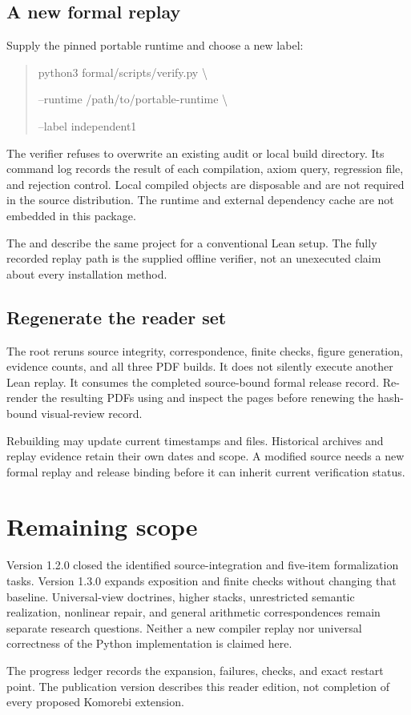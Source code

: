 \documentclass[11pt]{article}
\begin{document}
\subsection{A new formal replay}
Supply the pinned portable runtime and choose a new label:
\begin{quote}\small\ttfamily
python3 formal/scripts/verify.py \textbackslash\par
\hspace*{1em}--runtime /path/to/portable-runtime \textbackslash\par
\hspace*{1em}--label independent1
\end{quote}
The verifier refuses to overwrite an existing audit or local build directory. Its command log records the result of each compilation, axiom query, regression file, and rejection control. Local compiled objects are disposable and are not required in the source distribution. The runtime and external dependency cache are not embedded in this package.

The  and  describe the same project for a conventional Lean setup. The fully recorded replay path is the supplied offline verifier, not an unexecuted claim about every installation method.

\subsection{Regenerate the reader set}
The root  reruns source integrity, correspondence, finite checks, figure generation, evidence counts, and all three PDF builds. It does not silently execute another Lean replay. It consumes the completed source-bound formal release record. Re-render the resulting PDFs using  and inspect the pages before renewing the hash-bound visual-review record.

Rebuilding may update current timestamps and files. Historical archives and replay evidence retain their own dates and scope. A modified source needs a new formal replay and release binding before it can inherit current verification status.

\section{Remaining scope}
Version 1.2.0 closed the identified source-integration and five-item formalization tasks. Version 1.3.0 expands exposition and finite checks without changing that baseline. Universal-view doctrines, higher stacks, unrestricted semantic realization, nonlinear repair, and general arithmetic correspondences remain separate research questions. Neither a new compiler replay nor universal correctness of the Python implementation is claimed here.

The progress ledger records the expansion, failures, checks, and exact restart point. The publication version describes this reader edition, not completion of every proposed Komorebi extension.
\end{document}
